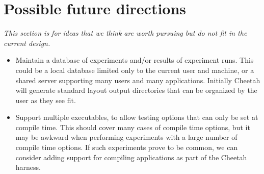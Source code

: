 \section{Possible future directions}

\emph{This section is for ideas that we think are worth pursuing but do not fit in the current design.}

\begin{itemize}
\item
Maintain a database of experiments and/or results of experiment runs. This
could be a local database limited only to the current user and machine, or
a shared server supporting many users and many applications. Initially
Cheetah will generate standard layout output directories that can be organized
by the user as they see fit.

\item
Support multiple executables, to allow testing options that can only be set at
compile time. This should cover many cases of compile time options, but it may
be awkward when performing experiments with a large number of compile time
options. If such experiments prove to be common, we can consider adding support
for compiling applications as part of the Cheetah harness.
\end{itemize}
